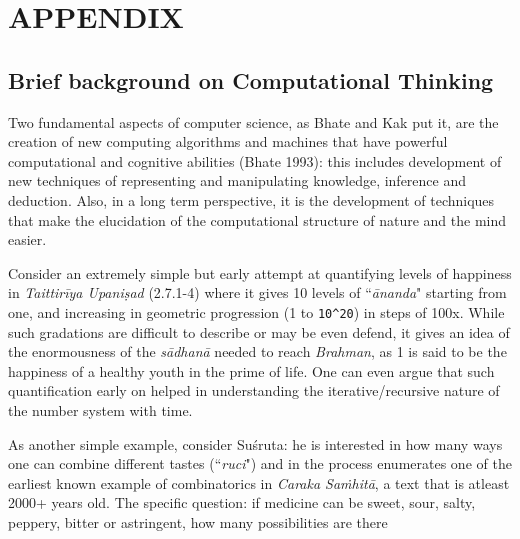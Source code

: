 {\appendix
\section{APPENDIX}\label{chap3-app1}


\subsection*{Brief background on Computational Thinking}

Two fundamental aspects of computer science, as Bhate and Kak put it, are the creation of new computing algorithms and machines that have powerful computational and cognitive abilities (Bhate 1993): this includes development of new techniques of representing and manipulating knowledge, inference and deduction. Also, in a long term perspective, it is the development of techniques that make the elucidation of the computational structure of nature and the mind easier.

Consider an extremely simple but early attempt at quantifying levels of happiness in \textsl{Taittirīya Upaniṣad} (2.7.1-4) where it gives 10 levels of “\textsl{ānanda}" starting from one, and increasing in geometric progression (1 to \verb|10^20|) in steps of 100x. While such gradations are difficult to describe or may be even defend, it gives an idea of the enormousness of the \textsl{sādhanā} needed to reach \textsl{Brahman}, as 1 is said to be the happiness of a healthy youth in the prime of life. One can even argue that such quantification early on helped in understanding the iterative/recursive nature of the number system with time.

As another simple example, consider Suśruta: he is interested in how many ways one can combine different tastes (``\textsl{ruci}") and in the process enumerates one of the earliest known example of combinatorics in \textsl{Caraka Saṁhitā}, a text that is atleast 2000+ years old. The specific question: if medicine can be sweet, sour, salty, peppery, bitter or astringent, how many possibilities are there 

}
